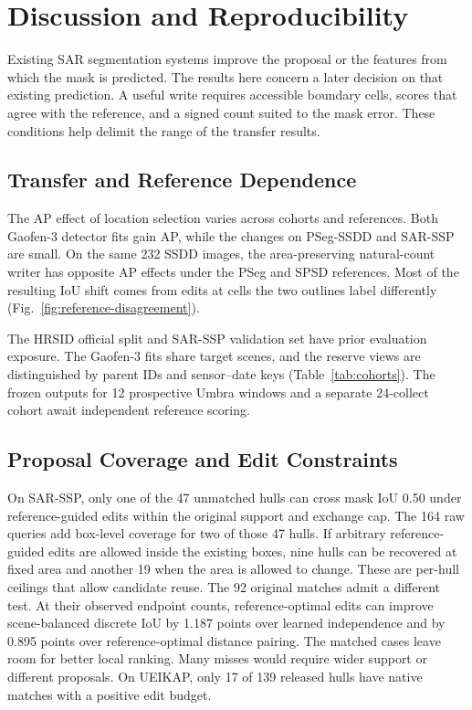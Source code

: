 \documentclass[journal]{IEEEtran}
\begin{document}
\section{Discussion and Reproducibility}

Existing SAR segmentation systems improve the proposal or the features from which the mask is predicted. The results here concern a later decision on that existing prediction. A useful write requires accessible boundary cells, scores that agree with the reference, and a signed count suited to the mask error. These conditions help delimit the range of the transfer results.
\subsection{Transfer and Reference Dependence}
The AP effect of location selection varies across cohorts and references. Both Gaofen-3 detector fits gain AP, while the changes on PSeg-SSDD and SAR-SSP are small. On the same 232 SSDD images, the area-preserving natural-count writer has opposite AP effects under the PSeg and SPSD references. Most of the resulting IoU shift comes from edits at cells the two outlines label differently (Fig.~\ref{fig:reference-disagreement}).

The HRSID official split and SAR-SSP validation set have prior evaluation exposure. The Gaofen-3 fits share target scenes, and the reserve views are distinguished by parent IDs and sensor--date keys (Table~\ref{tab:cohorts}). The frozen outputs for 12 prospective Umbra windows and a separate 24-collect cohort await independent reference scoring.

\subsection{Proposal Coverage and Edit Constraints}
On SAR-SSP, only one of the 47 unmatched hulls can cross mask IoU 0.50 under reference-guided edits within the original support and exchange cap. The 164 raw queries add box-level coverage for two of those 47 hulls. If arbitrary reference-guided edits are allowed inside the existing boxes, nine hulls can be recovered at fixed area and another 19 when the area is allowed to change. These are per-hull ceilings that allow candidate reuse. The 92 original matches admit a different test. At their observed endpoint counts, reference-optimal edits can improve scene-balanced discrete IoU by 1.187 points over learned independence and by 0.895 points over reference-optimal distance pairing. The matched cases leave room for better local ranking. Many misses would require wider support or different proposals. On UEIKAP, only 17 of 139 released hulls have native matches with a positive edit budget.
\end{document}
